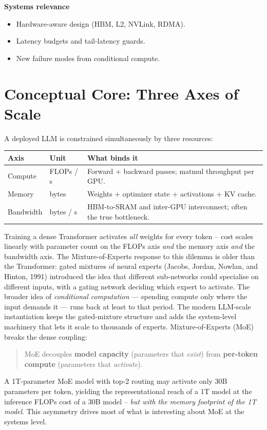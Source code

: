 \textbf{Systems relevance}
\begin{itemize}
  \item Hardware-aware design (HBM, L2, NVLink, RDMA).
  \item Latency budgets and tail-latency guards.
  \item New failure modes from conditional compute.
\end{itemize}

\section{Conceptual Core: Three Axes of Scale}

A deployed LLM is constrained simultaneously by three resources:
\begin{center}
\begin{tabular}{|p{2.6cm}|p{3.4cm}|p{8.0cm}|}
\hline
Axis & Unit & What binds it \\
\hline
Compute   & FLOPs / s   & Forward + backward passes; matmul
                          throughput per GPU. \\
Memory    & bytes       & Weights + optimizer state + activations +
                          KV cache. \\
Bandwidth & bytes / s   & HBM-to-SRAM and inter-GPU interconnect;
                          often the true bottleneck. \\
\hline
\end{tabular}
\end{center}

Training a dense Transformer activates \emph{all} weights for every
token -- cost scales linearly with parameter count on the FLOPs axis
\emph{and} the memory axis \emph{and} the bandwidth axis.
The Mixture-of-Experts response to this dilemma is older than the
Transformer: gated mixtures of neural experts (Jacobs, Jordan,
Nowlan, and Hinton, 1991) introduced the idea that different
sub-networks could specialise on different inputs, with a gating
network deciding which expert to activate. The broader idea of
\emph{conditional computation} --- spending compute only where the
input demands it --- runs back at least to that period. The modern
LLM-scale instantiation \citep{shazeer2017outrageously,
fedus2021switch} keeps the gated-mixture structure and adds the
system-level machinery that lets it scale to thousands of experts. Mixture-of-Experts (MoE) breaks the dense
coupling:
\begin{quote}
MoE decouples \textbf{model capacity} (parameters that \emph{exist})
from \textbf{per-token compute} (parameters that \emph{activate}).
\end{quote}
A 1T-parameter MoE model with top-2 routing may activate only 30B
parameters per token, yielding the representational reach of a 1T
model at the inference FLOPs cost of a 30B model -- \emph{but with the
memory footprint of the 1T model}. This asymmetry drives most of what
is interesting about MoE at the systems level.

